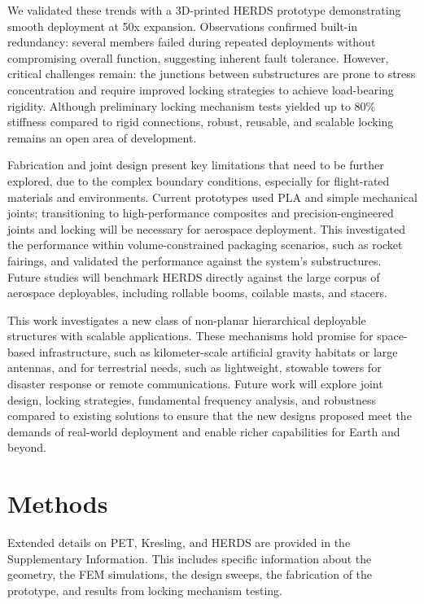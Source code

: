 {We validated these trends with a 3D-printed HERDS prototype demonstrating smooth deployment at 50x expansion. Observations confirmed built-in redundancy: several members failed during repeated deployments without compromising overall function, suggesting inherent fault tolerance. However, critical challenges remain: the junctions between substructures are prone to stress concentration and require improved locking strategies to achieve load-bearing rigidity. Although preliminary locking mechanism tests yielded up to 80\% stiffness compared to rigid connections, robust, reusable, and scalable locking remains an open area of development.}

{Fabrication and joint design present key limitations that need to be further explored, due to the complex boundary conditions, especially for flight-rated materials and environments. Current prototypes used PLA and simple mechanical joints; transitioning to high-performance composites and precision-engineered joints and locking will be necessary for aerospace deployment. This investigated the performance within volume-constrained packaging scenarios, such as rocket fairings, and validated the performance against the system's substructures. Future studies will benchmark HERDS directly against the large corpus of aerospace deployables, including rollable booms, coilable masts, and stacers.}

{This work investigates a new class of non-planar hierarchical deployable structures with scalable applications. These mechanisms hold promise for space-based infrastructure, such as kilometer-scale artificial gravity habitats or large antennas, and for terrestrial needs, such as lightweight, stowable towers for disaster response or remote communications. Future work will explore joint design, locking strategies, fundamental frequency analysis, and robustness compared to existing solutions to ensure that the new designs proposed meet the demands of real-world deployment and enable richer capabilities for Earth and beyond.
}

\section{Methods}
Extended details on PET, Kresling, and HERDS are provided in the Supplementary Information. This includes specific information about the geometry, the FEM simulations, the design sweeps, the fabrication of the prototype, and results from locking mechanism testing. 



